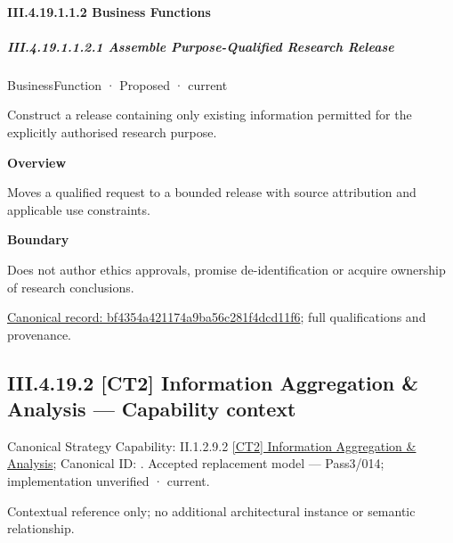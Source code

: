 \paragraph*{III.4.19.1.1.2 Business Functions}
\label{navigation:III.4.19.1.1.2}

\subparagraph*{III.4.19.1.1.2.1 Assemble Purpose-Qualified Research Release}
\label{navigation:III.4.19.1.1.2.1}

\label{element:bf4354a421174a9ba56c281f4dcd11f6}
{\small BusinessFunction · Proposed · current}\par

Construct a release containing only existing information permitted for the explicitly authorised research purpose.



\textbf{Overview}



Moves a qualified request to a bounded release with source attribution and applicable use constraints.



\textbf{Boundary}



Does not author ethics approvals, promise de-identification or acquire ownership of research conclusions.


{\footnotesize \href{../../../../continuum/business/business-function/bf4354a421174a9ba56c281f4dcd11f6.md}{Canonical record: bf4354a421174a9ba56c281f4dcd11f6}; full qualifications and provenance.}\par
\subsection*{III.4.19.2 [CT2] Information Aggregation \& Analysis — Capability context}
\label{navigation:III.4.19.2}

{\small Canonical Strategy Capability: II.1.2.9.2 \hyperref[element:1387ed8b07444d06a10eb60a47d5af8a]{[CT2] Information Aggregation \& Analysis}; Canonical ID: \texttt{}. Accepted replacement model — Pass3/014; implementation unverified · current.}\par
Contextual reference only; no additional architectural instance or semantic relationship.\par
